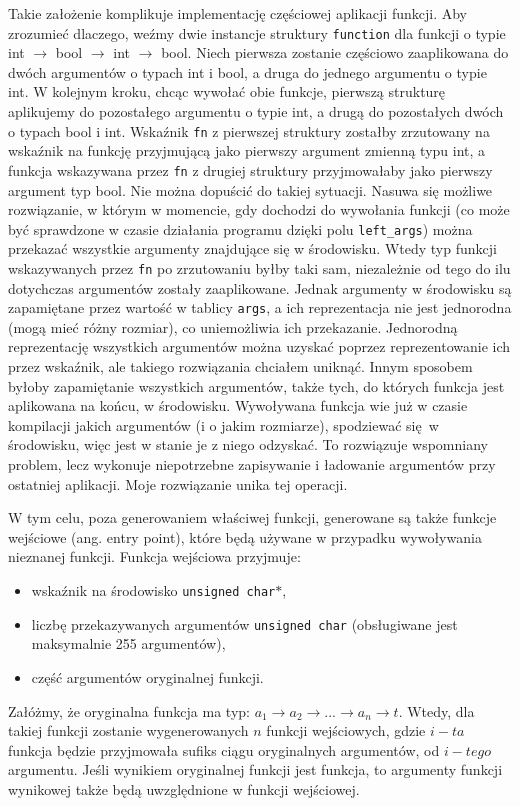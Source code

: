 \documentclass[declaration,shortabstract]{iithesis}
\begin{document}
Takie założenie komplikuje implementację częściowej aplikacji funkcji. Aby 
zrozumieć dlaczego, weźmy dwie instancje struktury \texttt{function} dla 
funkcji o typie \newline int $\rightarrow$ bool $\rightarrow$ int 
$\rightarrow$ bool. Niech pierwsza zostanie częściowo zaaplikowana do dwóch 
argumentów o typach int i bool, a druga do jednego argumentu
o typie int. W kolejnym kroku, chcąc wywołać obie funkcje, 
pierwszą strukturę aplikujemy do pozostałego argumentu o typie int, a
drugą do pozostałych dwóch o typach bool i int. Wskaźnik 
\texttt {fn} z pierwszej struktury zostałby zrzutowany na wskaźnik na funkcję 
przyjmującą jako pierwszy argument zmienną typu int, a funkcja 
wskazywana przez \texttt{fn} z drugiej struktury przyjmowałaby jako pierwszy 
argument typ bool. Nie można dopuścić do takiej sytuacji. Nasuwa się 
możliwe rozwiązanie, w którym w momencie, gdy dochodzi do wywołania funkcji (co 
może być sprawdzone w czasie działania programu dzięki polu 
\texttt{left\_args}) można przekazać wszystkie argumenty znajdujące się w 
środowisku. Wtedy typ funkcji wskazywanych przez \texttt{fn} po zrzutowaniu byłby 
taki sam, niezależnie od tego do ilu dotychczas argumentów zostały zaaplikowane.
Jednak argumenty w środowisku są zapamiętane przez wartość w tablicy \texttt
{args}, a ich reprezentacja nie jest jednorodna (mogą mieć różny rozmiar),
co uniemożliwia ich przekazanie.
Jednorodną reprezentację wszystkich argumentów można uzyskać poprzez 
reprezentowanie ich przez wskaźnik, ale takiego rozwiązania chciałem uniknąć.
Innym sposobem byłoby zapamiętanie wszystkich argumentów, także tych,
do których funkcja jest aplikowana na końcu, w środowisku. 
Wywoływana funkcja wie już w czasie 
kompilacji jakich argumentów (i o jakim rozmiarze), spodziewać się w środowisku,
więc jest w stanie je z niego odzyskać. To rozwiązuje wspomniany 
problem, lecz wykonuje niepotrzebne zapisywanie i ładowanie argumentów 
przy ostatniej aplikacji. Moje rozwiązanie unika tej operacji. 

W tym celu, poza generowaniem właściwej funkcji, generowane są także funkcje 
wejściowe (ang. entry point), które będą używane w przypadku wywoływania 
nieznanej funkcji. 
Funkcja wejściowa przyjmuje: 
\begin{itemize}
  \item wskaźnik na środowisko \texttt{unsigned char$\ast$},
  \item liczbę przekazywanych argumentów \texttt{unsigned char} 
  (obsługiwane jest maksymalnie 255 argumentów),
  \item część argumentów oryginalnej funkcji.
\end{itemize}
Załóżmy, że oryginalna funkcja ma typ: $a_1 \rightarrow a_2 \rightarrow ...
\rightarrow a_n \rightarrow t$. Wtedy, dla takiej funkcji zostanie wygenerowanych $n$ funkcji 
wejściowych, gdzie $i-ta$ funkcja będzie przyjmowała sufiks ciągu oryginalnych
argumentów, od $i-tego$ argumentu. Jeśli wynikiem oryginalnej funkcji jest 
funkcja, to argumenty funkcji wynikowej także będą uwzględnione w funkcji wejściowej.
\end{document}
